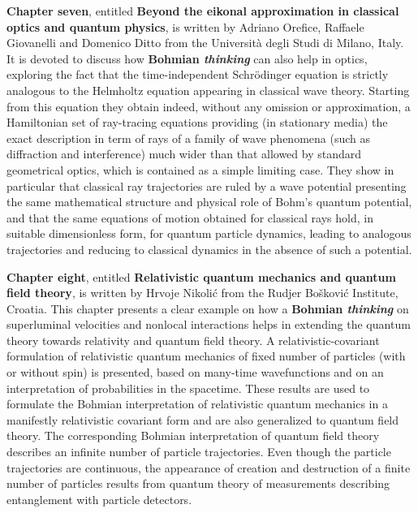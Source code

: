 \documentclass[nofootinbib, secnumarabic, amsmath, nobibnotes,11pt,aps,pra, floatfix]{revtex4-1}
\begin{document}
\textbf{Chapter seven}, entitled \textbf{Beyond the eikonal approximation in classical optics and quantum physics}, is written by Adriano Orefice, Raffaele Giovanelli and Domenico Ditto from the Universit\`{a} degli Studi di Milano, Italy. It is devoted to discuss how \textbf{Bohmian \emph{thinking}} can also help in optics, exploring the fact that the time-independent Schr\"{o}dinger equation is strictly analogous to the Helmholtz equation appearing in classical wave theory. Starting from this equation they obtain indeed, without any omission or approximation, a Hamiltonian set of ray-tracing equations providing (in stationary media) the exact description in term of rays of a family of wave phenomena (such as diffraction and interference) much wider than that allowed by standard geometrical optics, which is contained as a simple limiting case. They show in particular that classical ray trajectories are ruled by a wave potential presenting the same mathematical structure and physical role of Bohm's quantum potential, and that the same equations of motion obtained for classical rays hold, in suitable dimensionless form, for quantum particle dynamics, leading to analogous trajectories and reducing to classical dynamics in the absence of such a potential.

\textbf{Chapter eight}, entitled \textbf{Relativistic quantum mechanics and quantum field theory}, is written by Hrvoje Nikoli\'c from the Rudjer Bo\v{s}kovi\'c Institute, Croatia. This chapter presents a clear example on how a \textbf{Bohmian \emph{thinking}} on superluminal velocities and nonlocal interactions helps in extending the quantum theory towards relativity and quantum field theory. A relativistic-covariant formulation of relativistic quantum mechanics of fixed number of particles (with or without spin) is presented, based on many-time wavefunctions and on an interpretation of probabilities in the spacetime. These results are used to formulate the Bohmian interpretation of relativistic quantum mechanics in a manifestly relativistic covariant form and are also generalized to quantum field theory. The corresponding Bohmian interpretation of quantum field theory describes an infinite number of particle trajectories. Even though the particle trajectories are continuous, the appearance of creation and destruction of a finite number of particles results from quantum theory of measurements describing entanglement with particle detectors.
\end{document}
